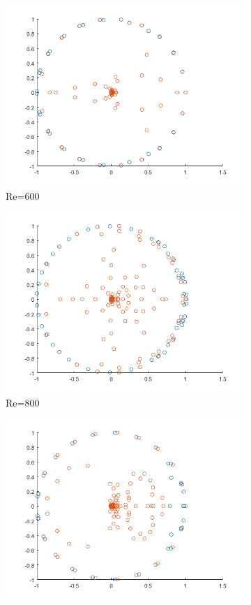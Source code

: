 \documentclass[letterpaper,12pt,peerreviewca,draftcls]{IEEEtran}
\begin{document}
\begin{figure}[!h]
\begin{subfigure}[t]{0.48\textwidth}
		\includegraphics[width=\linewidth]{"Figure 17c"}
		\caption{Re=600}
	\end{subfigure}
	\begin{subfigure}[t]{0.48\textwidth}
		\includegraphics[width=\linewidth]{"Figure 17d"}
		\caption{Re=800}
	\end{subfigure}
	\begin{subfigure}[t]{0.48\textwidth}
		\includegraphics[width=\linewidth]{"Figure 17e"}

\end{subfigure}
\end{figure}
\end{document}
